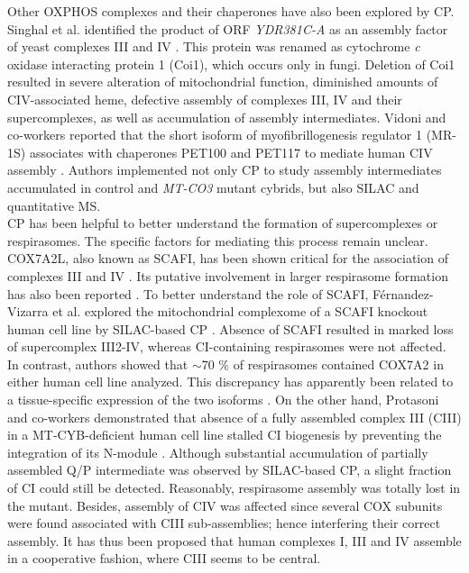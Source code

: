 Other OXPHOS complexes and their chaperones have also been explored by CP. Singhal et al. identified the product of ORF \emph{YDR381C-A} as an assembly factor of yeast complexes III and IV \cite{Singhal_2017}. This protein was renamed as cytochrome \emph{c} oxidase interacting protein 1 (Coi1), which occurs only in fungi. Deletion of Coi1 resulted in severe alteration of mitochondrial function, diminished amounts of CIV-associated heme, defective assembly of complexes III, IV and their supercomplexes, as well as accumulation of assembly intermediates. Vidoni and co-workers reported that the short isoform of myofibrillogenesis regulator 1 (MR-1S) associates with chaperones PET100 and PET117 to mediate human CIV assembly \cite{Vidoni_2017}. Authors implemented not only CP to study assembly intermediates accumulated in control and \emph{MT-CO3} mutant cybrids, but also SILAC and quantitative MS.\\
CP has been helpful to better understand the formation of supercomplexes or respirasomes. The specific factors for mediating this process remain unclear. COX7A2L, also known as SCAFI, has been shown critical for the association of complexes III and IV \cite{Perez-Perez_2016}. Its putative involvement in larger respirasome formation has also been reported \cite{Lapuente-Brun_2013}. To better understand the role of SCAFI, Férnandez-Vizarra et al. explored the mitochondrial complexome of a SCAFI knockout human cell line by SILAC-based CP \cite{Fernández-Vizarra_2021}. Absence of SCAFI resulted in marked loss of supercomplex III2-IV, whereas CI-containing respirasomes were not affected. In contrast, authors showed that $\sim$70 \% of respirasomes contained COX7A2 in either human cell line analyzed. This discrepancy has apparently been related to a tissue-specific expression of the two isoforms \cite{Lapuente-Brun_2013}. On the other hand, Protasoni and co-workers demonstrated that absence of a fully assembled complex III (CIII) in a MT-CYB-deficient human cell line stalled CI biogenesis by preventing the integration of its N-module \cite{Protasoni_2020}. Although substantial accumulation of partially assembled Q/P intermediate was observed by SILAC-based CP, a slight fraction of CI could still be detected. Reasonably, respirasome assembly was totally lost in the mutant. Besides, assembly of CIV was affected since several COX subunits were found associated with CIII sub-assemblies; hence interfering their correct assembly. It has thus been proposed that human complexes I, III and IV assemble in a cooperative fashion, where CIII seems to be central.

